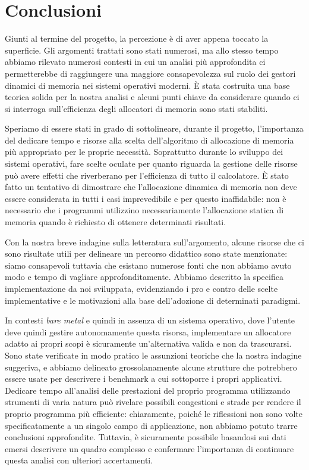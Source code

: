 \chapter{Conclusioni}

Giunti al termine del progetto, la percezione è di aver appena toccato la superficie. Gli argomenti trattati sono stati numerosi, ma allo stesso tempo abbiamo rilevato numerosi contesti in cui un analisi più approfondita ci permetterebbe di raggiungere una maggiore consapevolezza sul ruolo dei gestori dinamici di memoria nei sistemi operativi moderni. È stata costruita una base teorica solida per la nostra analisi e alcuni punti chiave da considerare quando ci si interroga sull'efficienza degli allocatori di memoria sono stati stabiliti.

Speriamo di essere stati in grado di sottolineare, durante il progetto, l'importanza del dedicare tempo e risorse alla scelta dell'algoritmo di allocazione di memoria più appropriato per le proprie necessità. Soprattutto durante lo sviluppo dei sistemi operativi, fare scelte oculate per quanto riguarda la gestione delle risorse può avere effetti che riverberano per l'efficienza di tutto il calcolatore. È stato fatto un tentativo di dimostrare che l’allocazione dinamica di memoria non deve essere considerata in tutti i casi imprevedibile e per questo inaffidabile: non è necessario che i programmi utilizzino necessariamente l'allocazione statica di memoria quando è richiesto di ottenere determinati risultati.

Con la nostra breve indagine sulla letteratura sull’argomento, alcune risorse che ci sono risultate utili per delineare un percorso didattico sono state menzionate: siamo consapevoli tuttavia che esistano numerose fonti che non abbiamo avuto modo e tempo di vagliare approfonditamente. Abbiamo descritto la specifica implementazione da noi sviluppata, evidenziando i pro e contro delle scelte implementative e le motivazioni alla base dell’adozione di determinati paradigmi. 

In contesti \textit{bare metal} e quindi in assenza di un sistema operativo, dove l'utente deve quindi gestire autonomamente questa risorsa, implementare un allocatore adatto ai propri scopi è sicuramente un'alternativa valida e non da trascurarsi. Sono state verificate in modo pratico le assunzioni teoriche che la nostra indagine suggeriva, e abbiamo delineato grossolanamente alcune strutture che potrebbero essere usate per descrivere i benchmark a cui sottoporre i propri applicativi. Dedicare tempo all'analisi delle prestazioni del proprio programma utilizzando strumenti di varia natura può rivelare possibili congestioni e strade per rendere il proprio programma più efficiente: chiaramente, poiché le riflessioni non sono volte specificatamente a un singolo campo di applicazione, non abbiamo potuto trarre conclusioni approfondite. Tuttavia, è sicuramente possibile basandosi sui dati emersi descrivere un quadro complesso e confermare l'importanza di continuare questa analisi con ulteriori accertamenti. 
 

